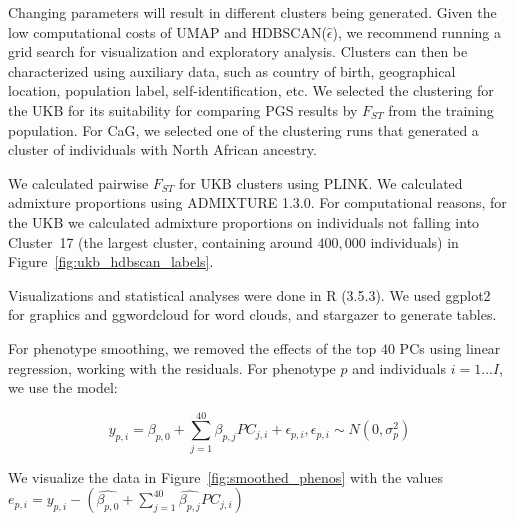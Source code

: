 Changing parameters will result in different clusters being generated. Given the low computational costs of UMAP and HDBSCAN($\hat{\epsilon}$), we recommend running a grid search for visualization and exploratory analysis. Clusters can then be characterized using auxiliary data, such as country of birth, geographical location, population label, self-identification, etc. We selected the clustering for the UKB for its suitability for comparing PGS results by $F_{ST}$ from the training population. For CaG, we selected one of the clustering runs that generated a cluster of individuals with North African ancestry.

We calculated pairwise $F_{ST}$ for UKB clusters using PLINK\citep{purcell_plink_2007}. We calculated admixture proportions using ADMIXTURE 1.3.0\citep{alexander_fast_2009}. For computational reasons, for the UKB we calculated admixture proportions on individuals not falling into Cluster~17 (the largest cluster, containing around $400,000$ individuals) in Figure~\ref{fig:ukb_hdbscan_labels}.

Visualizations and statistical analyses were done in R (3.5.3)\citep{r_2018}. We used ggplot2\citep{wickham_2016} for graphics and ggwordcloud for word clouds, and stargazer\citep{Hlavac2018-fy} to generate tables.

For phenotype smoothing, we removed the effects of the top $40$ PCs using linear regression, working with the residuals. For phenotype $p$ and individuals $i=1 \dots I$, we use the model:

$$ y_{p,i} = \beta_{p,0} + \sum_{j=1}^{40}\beta_{p,j}PC_{j,i} + \epsilon_{p,i},  \epsilon_{p,i} \sim N(0,\sigma^2_{p}) $$

We visualize the data in Figure~\ref{fig:smoothed_phenos} with the values $ e_{p,i} = y_{p,i} - (\hat{\beta_{p,0}} + \sum_{j=1}^{40}\hat{\beta_{p,j}}PC_{j,i}) $



\clearpage



\clearpage